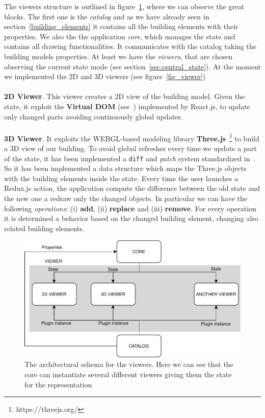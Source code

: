 The viewers structure is outlined in figure~\ref{fig_viewers}, where we can observe the great blocks. The first one is the \textit{catalog} and as we have already seen in section~\ref{building_elements} it contains all the building elements with their properties. We also the the application \textit{core}, which manages the state and contains all drawing functionalities. It communicates with the catalog taking the building models properties. At least we have the \textit{viewers}, that are chosen observing the current state mode (see section~\ref{sec:central_state}). At the moment we implemented the 2D and 3D viewers (see figure~\ref{fig_viewer})\\\\
\textbf{2D Viewer}. This viewer creates a 2D view of the building model. Given the state, it exploit the \textbf{Virtual DOM} (see~\cite{vdom}) implemented by React.js, to update only changed parts avoiding continuously global updates.\\\\
\textbf{3D Viewer}. It exploits the WEBGL-based modeling library \textbf{Three.js}~\footnote{https://threejs.org/} to build a 3D view of our building. To avoid global refreshes every time we update a part of the state, it has been implemented a \texttt{diff} and \textit{patch} system standardized in~\cite{rfc6902}. So it has been implemented a data structure which maps the Three.js objects with the building elements inside the state. Every time the user launches a Redux.js action, the application compute the difference between the old state and the new one a redraw only the changed objects. In particular we can have the following \textit{operations}: (i) \textbf{add}, (ii) \textbf{replace} and (iii) \textbf{remove}. For every operation it is determined a behavior based on the changed building element, changing also related building elements.

\begin{figure}[htb]
\centering
\includegraphics[width=\linewidth]{contents/images/diagramma-visualizzatori}

\caption{The architectural schema for the viewers. Here we can see that the core can instantiate several different viewers giving them the state for the representation}
\label{fig_viewers}
\end{figure}

